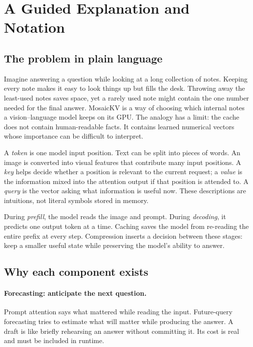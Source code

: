 \section{A Guided Explanation and Notation}
\label{app:tutorial}
\subsection{The problem in plain language}
Imagine answering a question while looking at a long collection of notes.
Keeping every note makes it easy to look things up but fills the desk.
Throwing away the least-used notes saves space, yet a rarely used note might
contain the one number needed for the final answer. MosaicKV is a way of
choosing which internal notes a vision--language model keeps on its GPU.
The analogy has a limit: the cache does not contain human-readable facts.
It contains learned numerical vectors whose importance can be difficult to
interpret.

A \emph{token} is one model input position. Text can be split into pieces of
words. An image is converted into visual features that contribute many input
positions. A \emph{key} helps decide whether a position is relevant to the
current request; a \emph{value} is the information mixed into the attention
output if that position is attended to. A \emph{query} is the vector asking
what information is useful now. These descriptions are intuitions, not literal
symbols stored in memory.

During \emph{prefill}, the model reads the image and prompt. During
\emph{decoding}, it predicts one output token at a time. Caching saves the
model from re-reading the entire prefix at every step. Compression inserts a
decision between these stages: keep a smaller useful state while preserving
the model's ability to answer.

\subsection{Why each component exists}
\paragraph{Forecasting: anticipate the next question.}
Prompt attention says what mattered while reading the input. Future-query
forecasting tries to estimate what will matter while producing the answer.
A draft is like briefly rehearsing an answer without committing it. Its
cost is real and must be included in runtime.

